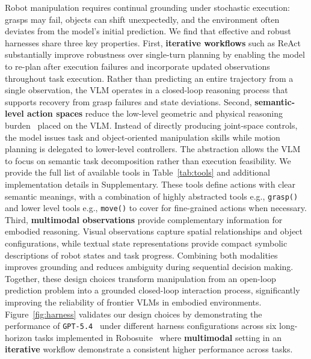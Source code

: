 \documentclass{llmxive}
\begin{document}
Robot manipulation requires continual grounding under stochastic execution: grasps may fail, objects can shift unexpectedly, and the environment often deviates from the model's initial prediction.
We find that effective and robust harnesses share three key properties. First, \textbf{iterative workflows} such as ReAct~\citep{yao2023reactsynergizingreasoningacting} substantially improve robustness over single-turn planning by enabling the model to re-plan after execution failures and incorporate updated observations throughout task execution. Rather than predicting an entire trajectory from a single observation, the VLM operates in a closed-loop reasoning process that supports recovery from grasp failures and state deviations.
Second, \textbf{semantic-level action spaces} reduce the low-level geometric and physical reasoning burden~\citep{tong2024cambrian1fullyopenvisioncentric, guan2024hallusionbenchadvanceddiagnosticsuite} placed on the VLM. Instead of directly producing joint-space controls, the model issues task and object-oriented manipulation skills while motion planning is delegated to lower-level controllers. The abstraction allows the VLM to focus on semantic task decomposition rather than execution feasibility.
We provide the full list of available tools in Table~\ref{tab:tools} and additional implementation details in Supplementary. 
These tools define actions with clear semantic meanings, with a combination of highly abstracted tools e.g., \texttt{grasp()} and lower level tools e.g., \texttt{move()} to cover for fine-grained actions when necessary.
Third, \textbf{multimodal observations} provide complementary information for embodied reasoning. Visual observations capture spatial relationships and object configurations, while textual state representations provide compact symbolic descriptions of robot states and task progress. Combining both modalities improves grounding and reduces ambiguity during sequential decision making.
Together, these design choices transform manipulation from an open-loop prediction problem into a grounded closed-loop interaction process, significantly improving the reliability of frontier VLMs in embodied environments.
Figure~\ref{fig:harness} validates our design choices by demonstrating the performance of \texttt{GPT-5.4}~\citep{openai2026gpt54} under different harness configurations across six long-horizon tasks implemented in Robosuite~\citep{robosuite2020} where \textbf{multimodal} setting in an \textbf{iterative} workflow demonstrate a consistent higher performance across tasks.
\end{document}
